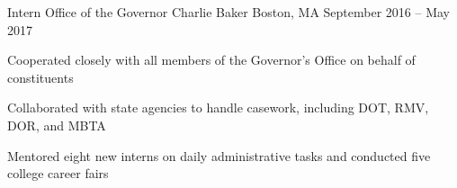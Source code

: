 \begin{cventries}
  \cventry
    {Intern} %
    {Office of the Governor Charlie Baker} %
    {Boston, MA} %
    {September 2016 – May 2017} %
    {
      \begin{cvitems} %
        \item {Cooperated closely with all members of the Governor’s Office on behalf of constituents}
        \item {Collaborated with state agencies to handle casework, including DOT, RMV, DOR, and MBTA}
        \item {Mentored eight new interns on daily administrative tasks and conducted five college career fairs}
      \end{cvitems}
    }



\end{cventries}
